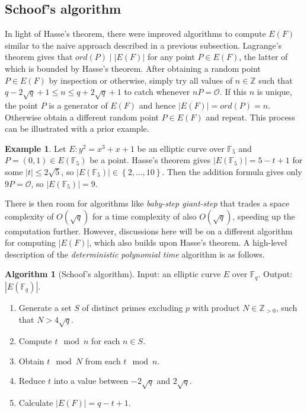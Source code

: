 \documentclass{article}
\newcommand{\F}{\mathbb{F}}
\newcommand{\Z}{\mathbb{Z}}
\newcommand{\rb}[1]{\left( #1 \right)}
\newcommand{\cb}[1]{\left\{ #1 \right\}}
\newcommand{\abs}[1]{\left\lvert #1 \right\rvert}
\theoremstyle{definition}
\newtheorem*{example}{Example}
\newtheorem{algorithm}[proposition]{Algorithm}
\begin{document}
\pagebreak

\subsection{Schoof's algorithm}

In light of Hasse's theorem, there were improved algorithms to compute $ E\rb{F} $ similar to the naive approach described in a previous subsection. Lagrange's theorem gives that $ ord\rb{P} \mid \abs{E\rb{F}} $ for any point $ P \in E\rb{F} $, the latter of which is bounded by Hasse's theorem. After obtaining a random point $ P \in E\rb{F} $ by inspection or otherwise, simply try all values of $ n \in \Z $ such that $ q - 2\sqrt{q} + 1 \le n \le q + 2\sqrt{q} + 1 $ to catch whenever $ nP = \mathcal{O} $. If this $ n $ is unique, the point $ P $ is a generator of $ E\rb{F} $ and hence $ \abs{E\rb{F}} = ord\rb{P} = n $. Otherwise obtain a different random point $ P \in E\rb{F} $ and repeat. This process can be illustrated with a prior example.

\begin{example}
Let $ E : y^2 = x^3 + x + 1 $ be an elliptic curve over $ \F_5 $ and $ P = \rb{0, 1} \in E\rb{\F_5} $ be a point. Hasse's theorem gives $ \abs{E\rb{\F_5}} = 5 - t + 1 $ for some $ \abs{t} \le 2\sqrt{5} $, so $ \abs{E\rb{\F_5}} \in \cb{2, \dots, 10} $. Then the addition formula gives only $ 9P = \mathcal{O} $, so $ \abs{E\rb{\F_5}} = 9 $.
\end{example}

There is then room for algorithms like \emph{baby-step giant-step} that trades a space complexity of $ O\rb{\sqrt{q}} $ for a time complexity of also $ O\rb{\sqrt{q}} $, speeding up the computation further. However, discussions here will be on a different algorithm for computing $ \abs{E\rb{F}} $, which also builds upon Hasse's theorem. A high-level description of the \emph{deterministic polynomial time} algorithm is as follows.

\begin{algorithm}[Schoof's algorithm]
Input: an elliptic curve $ E $ over $ \F_q $. Output: $ \abs{E\rb{\F_q}} $.
\begin{enumerate}
\item Generate a set $ S $ of distinct primes excluding $ p $ with product $ N \in \Z_{> 0} $, such that $ N > 4\sqrt{q} $.
\item Compute $ t \mod n $ for each $ n \in S $.
\item Obtain $ t \mod N $ from each $ t \mod n $.
\item Reduce $ t $ into a value between $ -2\sqrt{q} $ and $ 2\sqrt{q} $.
\item Calculate $ \abs{E\rb{F}} = q - t + 1 $.
\end{enumerate}
\end{algorithm}
\end{document}
